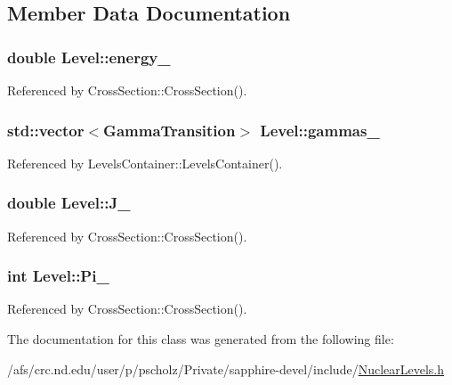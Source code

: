 \subsection{Member Data Documentation}
\hypertarget{classLevel_ad7a1c3e9c9af88945e4d80016251cdaf}{
\subsubsection[{energy\-\_\-}]{\setlength{\rightskip}{0pt plus 5cm}double Level\-::energy\-\_\-}}\label{classLevel_ad7a1c3e9c9af88945e4d80016251cdaf}


Referenced by Cross\-Section\-::\-Cross\-Section().

\hypertarget{classLevel_a11037583b37641411f0811740053ed33}{
\subsubsection[{gammas\-\_\-}]{\setlength{\rightskip}{0pt plus 5cm}std\-::vector$<${\bf Gamma\-Transition}$>$ Level\-::gammas\-\_\-}}\label{classLevel_a11037583b37641411f0811740053ed33}


Referenced by Levels\-Container\-::\-Levels\-Container().

\hypertarget{classLevel_aa0a9158f0edaed1fedd27f310db4d344}{
\subsubsection[{J\-\_\-}]{\setlength{\rightskip}{0pt plus 5cm}double Level\-::\-J\-\_\-}}\label{classLevel_aa0a9158f0edaed1fedd27f310db4d344}


Referenced by Cross\-Section\-::\-Cross\-Section().

\hypertarget{classLevel_a3cee365520b4879a70dfb4362fe59fe3}{
\subsubsection[{Pi\-\_\-}]{\setlength{\rightskip}{0pt plus 5cm}int Level\-::\-Pi\-\_\-}}\label{classLevel_a3cee365520b4879a70dfb4362fe59fe3}


Referenced by Cross\-Section\-::\-Cross\-Section().



The documentation for this class was generated from the following file\-:\begin{DoxyCompactItemize}
\item 
/afs/crc.\-nd.\-edu/user/p/pscholz/\-Private/sapphire-\/devel/include/\hyperlink{NuclearLevels_8h}{Nuclear\-Levels.\-h}\end{DoxyCompactItemize}
